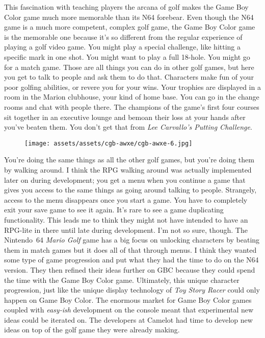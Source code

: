 \documentclass{book}
\begin{document}
This fascination with teaching players the arcana of golf makes the Game Boy Color game much more memorable than its N64 forebear. Even though the N64 game is a much more competent, complex golf game, the Game Boy Color game is the memorable one because it’s so different from the regular experience of playing a golf video game. You might play a special challenge, like hitting a specific mark in one shot. You might want to play a full 18-hole. You might go for a match game. Those are all things you can do in other golf games, but here you get to talk to people and ask them to do that. Characters make fun of your poor golfing abilities, or revere you for your wins. Your trophies are displayed in a room in the Marion clubhouse, your kind of home base. You can go in the change rooms and chat with people there. The champions of the game’s first four courses sit together in an executive lounge and bemoan their loss at your hands after you’ve beaten them. You don’t get that from \emph{Lee Carvallo’s Putting Challenge}.

\begin{figure}[hbt]
\vskip 10pt
\centering \texttt{[image: assets/assets/cgb-awxe/cgb-awxe-6.jpg]}
\vskip 6pt
\end{figure}
You’re doing the same things as all the other golf games, but you’re doing them by walking around. I think the RPG walking around was actually implemented later on during development; you get a menu when you continue a game that gives you access to the same things as going around talking to people. Strangely, access to the menu disappears once you start a game. You have to completely exit your save game to see it again. It’s rare to see a game duplicating functionality. This leads me to think they might not have intended to have an RPG-lite in there until late during development. I’m not so sure, though. The Nintendo~64 \emph{Mario Golf} game has a big focus on unlocking characters by beating them in match games but it does all of that through menus. I think they wanted some type of game progression and put what they had the time to do on the N64 version. They then refined their ideas further on GBC because they could spend the time with the Game Boy Color game. Ultimately, this unique character progression, just like the unique display technology of \emph{Toy Story Racer} could only happen on Game Boy Color. The enormous market for Game Boy Color games coupled with \emph{easy-ish} development on the console meant that experimental new ideas could be iterated on. The developers at Camelot had time to develop new ideas on top of the golf game they were already making.
\end{document}
